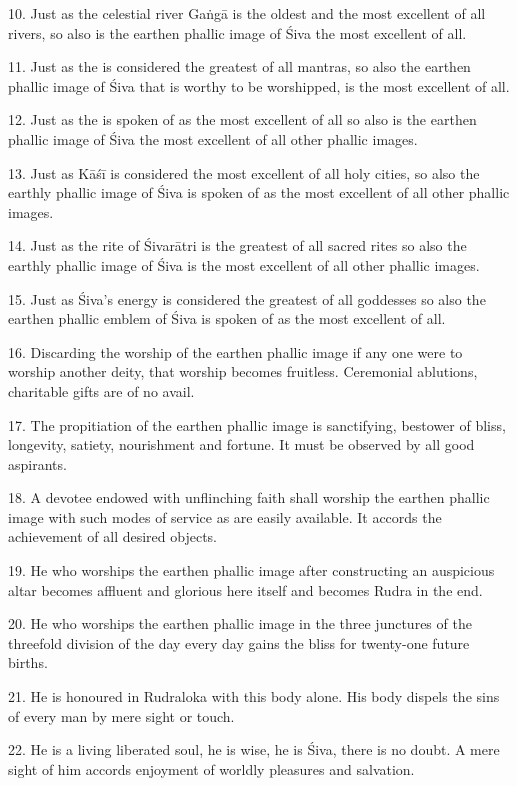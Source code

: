 10. Just as the celestial river Gaṅgā is the oldest and the most excellent of
all rivers, so also is the earthen phallic image of Śiva the most excellent of
all.

11. Just as the  is considered the greatest of all mantras, so also
the earthen phallic image of Śiva that is worthy to be worshipped, is the most
excellent of all.

12. Just as the  is spoken of as the most excellent of all
 so also is the earthen phallic image of Śiva the most excellent of
all other phallic images.

13. Just as Kāśī is considered the most excellent of all holy cities, so also
the earthly phallic image of Śiva is spoken of as the most excellent of all
other phallic images.

14. Just as the rite of Śivarātri is the greatest of all sacred rites so also
the earthly phallic image of Śiva is the most excellent of all other phallic
images.

15. Just as Śiva’s energy is considered the greatest of all goddesses so also
the earthen phallic emblem of Śiva is spoken of as the most excellent of all.

16. Discarding the worship of the earthen phallic image if any one were to
worship another deity, that worship becomes fruitless. Ceremonial ablutions,
charitable gifts \etc are of no avail.

17. The propitiation of the earthen phallic image is sanctifying, bestower of
bliss, longevity, satiety, nourishment and fortune. It must be observed by all
good aspirants.

18. A devotee endowed with unflinching faith shall worship the earthen phallic
image with such modes of service as are easily available. It accords
the achievement of all desired objects.

19. He who worships the earthen phallic image after constructing an auspicious
altar becomes affluent and glorious here itself and becomes Rudra in the end.

20. He who worships the earthen phallic image in the three junctures of
the threefold division of the day every day gains the bliss for twenty-one
future births.

21. He is honoured in Rudraloka with this body alone. His body dispels the sins
of every man by mere sight or touch.

22. He is a living liberated soul, he is wise, he is Śiva, there is no doubt.
A mere sight of him accords enjoyment of worldly pleasures and salvation.

